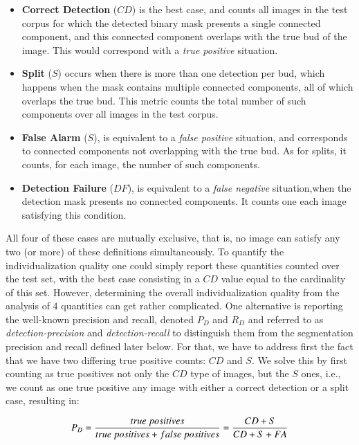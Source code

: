 \documentclass[a4paper,authoryear,review]{elsarticle}
\begin{document}
\begin{itemize}
	\item \textbf{Correct Detection} ($CD$) is the best case, and counts all images in the test corpus for which the detected binary mask presents a single connected component, and this connected component overlaps with the true bud of the image. This would correspond with a \emph{true positive} situation.
	\item \textbf{Split} ($S$) occurs when there is more than one detection per bud, which happens  when the mask contains multiple connected components, all of which overlaps the true bud. This metric counts the total number of such components over all images in the test corpus.
	\item \textbf{False Alarm} ($S$), is equivalent to a \emph{false positive} situation, and corresponds to connected components not overlapping with the true bud. As for splits, it counts, for each image, the number of such components.
	\item \textbf{Detection Failure} ($DF$), is equivalent to a \emph{false negative} situation,when the detection mask presents no connected components. It counts one each image satisfying this condition.
\end{itemize}

All four of these cases are mutually exclusive, that is, no image can satisfy any two (or more) of these definitions simultaneously. To quantify the individualization quality one could simply report these quantities counted over the test set, with the best case consisting in a $CD$ value equal to the cardinality of this set. However, determining the overall individualization quality from the analysis of $4$ quantities can get rather complicated. 
%
One alternative is reporting the well-known precision and recall, denoted $P_D$ and $R_D$ and referred to as  \emph{detection-precision} and \emph{detection-recall} to distinguish them from the segmentation precision and recall defined later below. For that, we have to address first the fact that  we have two differing true positive counts: $CD$ and $S$. We solve this by first counting as true positives not only the $CD$ type of images, but the $S$ ones, i.e., we count as one true positive any image with either a correct detection or a split case, resulting in:

\begin{equation}
P_D = \frac{true\ positives}{true\ positives+false\ positives} \\
= \frac{CD+S}{CD+S+FA}
\label{eq:detection-precision}
\end{equation}
\end{document}
